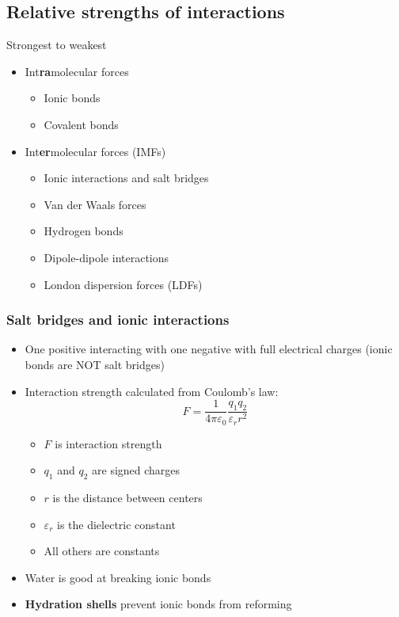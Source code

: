 \documentclass[a4paper, 12pt]{article}
\begin{document}
\subsection*{Relative strengths of interactions}
Strongest to weakest
\begin{itemize}
\item Int\textbf{ra}molecular forces
\begin{itemize}
\item Ionic bonds
\item Covalent bonds
\end{itemize}
\item Int\textbf{er}molecular forces (IMFs)
\begin{itemize}
\item Ionic interactions and salt bridges
\item Van der Waals forces
\item Hydrogen bonds
\item Dipole-dipole interactions
\item London dispersion forces (LDFs)
\end{itemize}
\end{itemize}

\subsubsection*{Salt bridges and ionic interactions}

\begin{itemize}
\item One positive interacting with one negative with full electrical charges (ionic bonds are NOT salt bridges)
\item Interaction strength calculated from Coulomb's law: $$ F = \frac{1}{4 \pi \varepsilon_0 } \frac{q_1q_2}{\varepsilon_r r^2}$$
\begin{itemize}
\item $F$ is interaction strength
\item $q_1$ and $q_2$ are signed charges
\item $r$ is the distance between centers
\item $\varepsilon_r$ is the dielectric constant
\item All others are constants
\end{itemize}
\item Water is good at breaking ionic bonds
\item \textbf{Hydration shells} prevent ionic bonds from reforming
\end{itemize}
\end{document}

